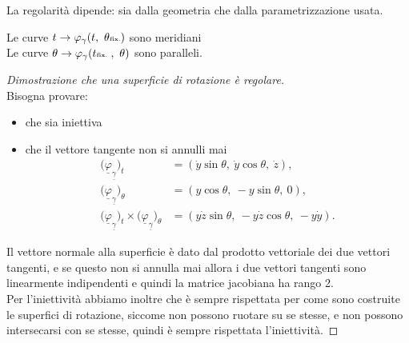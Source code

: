 \documentclass[a4paper, oneside]{article}
\begin{document}
\begin{observation}
La regolarità dipende: sia dalla geometria che dalla parametrizzazione usata.
\end{observation}


\begin{definition}
  Le curve $t \to \varphi_\gamma (t , \ \theta \text{\tiny{fix.}})$ sono meridiani\\
  Le curve $\theta \to \varphi_\gamma (t \text{\tiny{fix.} }, \  \theta)$ sono paralleli.
\end{definition}


\begin{proof}[Dimostrazione che una superficie di rotazione è regolare]
\hfill\\\noindent
Bisogna provare:
\begin{itemize}
  \item che sia iniettiva 
  \item che il vettore tangente non si annulli mai
  \[
  \begin{aligned}
    \bigl(\underline{\varphi}_{\underline{\gamma}}\bigr)_t
      &= (\dot y\sin\theta,\ \dot y\cos\theta,\ \dot z),\\
    \bigl(\underline{\varphi}_{\underline{\gamma}}\bigr)_\theta
      &= (y\cos\theta,\ -y\sin\theta,\ 0),\\
    \bigl(\underline{\varphi}_{\underline{\gamma}}\bigr)_t\times\bigl(\underline{\varphi}_{\underline{\gamma}}\bigr)_\theta
      &= (y\dot z\sin\theta,\ -y\dot z\cos\theta,\ -y\dot y).
  \end{aligned}
  \]
\end{itemize}
Il vettore normale alla superficie è dato dal prodotto vettoriale dei due vettori tangenti, e se questo non si annulla mai allora i due vettori tangenti sono linearmente indipendenti e quindi la matrice jacobiana ha rango 2.\\
Per l'iniettività abbiamo inoltre che è sempre rispettata per come sono costruite le superfici di rotazione, siccome non possono ruotare su se stesse, e non possono intersecarsi con se stesse, quindi è sempre rispettata l'iniettività.
\end{proof}
\end{document}
